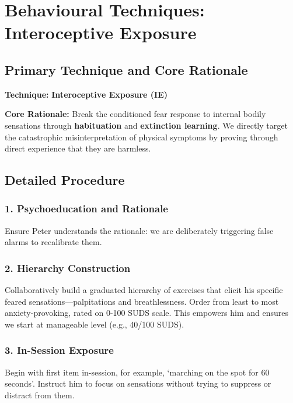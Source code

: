 \documentclass[
  american,
  letterpaper,
  DIV=11,
  numbers=noendperiod]{scrartcl}
\begin{document}
\section{Behavioural Techniques: Interoceptive
Exposure}\label{behavioural-techniques-interoceptive-exposure}

\subsection{Primary Technique and Core
Rationale}\label{primary-technique-and-core-rationale}

\textbf{Technique:} \textbf{Interoceptive Exposure (IE)}

\textbf{Core Rationale:} Break the conditioned fear response to internal
bodily sensations through \textbf{habituation} and \textbf{extinction
learning}. We directly target the catastrophic misinterpretation of
physical symptoms by proving through direct experience that they are
harmless.

\subsection{Detailed Procedure}\label{detailed-procedure}

\subsubsection{1. Psychoeducation and
Rationale}\label{psychoeducation-and-rationale}

Ensure Peter understands the rationale: we are deliberately triggering
false alarms to recalibrate them.

\subsubsection{2. Hierarchy Construction}\label{hierarchy-construction}

Collaboratively build a graduated hierarchy of exercises that elicit his
specific feared sensations---palpitations and breathlessness. Order from
least to most anxiety-provoking, rated on 0-100 SUDS scale. This
empowers him and ensures we start at manageable level (e.g., 40/100
SUDS).

\subsubsection{3. In-Session Exposure}\label{in-session-exposure}

Begin with first item in-session, for example, `marching on the spot for
60 seconds'. Instruct him to focus on sensations without trying to
suppress or distract from them.
\end{document}
